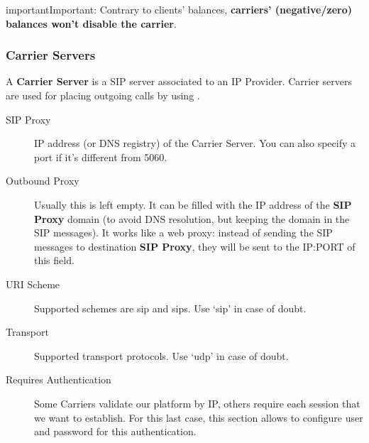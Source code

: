 \documentclass[letterpaper,10pt,english]{sphinxmanual}
\begin{document}
\begin{notice}{important}{Important:}
Contrary to clients' balances, \textbf{carriers' (negative/zero) balances won't disable the carrier}.
\end{notice}


\subsubsection{Carrier Servers}
\label{administration_portal/brand/providers/carriers:carrier-servers}
A \textbf{Carrier Server} is a SIP server associated to an IP Provider. Carrier servers
are used for placing outgoing calls by using {\hyperref[administration_portal/brand/routing/outgoing_routings:outgoing\string-routings]{}}.
\begin{description}
\item[{SIP Proxy}] \leavevmode{}\label{administration_portal/brand/providers/carriers:term-sip-proxy}
IP address (or DNS registry) of the Carrier Server. You can also specify
a port if it's different from 5060.

\item[{Outbound Proxy}] \leavevmode{}\label{administration_portal/brand/providers/carriers:term-outbound-proxy}
Usually this is left empty. It can be filled with the IP address of the
\textbf{SIP Proxy} domain (to avoid DNS resolution, but keeping the domain
in the SIP messages). It works like a web proxy: instead of sending the
SIP messages to destination \textbf{SIP Proxy}, they will be sent to the
IP:PORT of this field.

\item[{URI Scheme}] \leavevmode{}\label{administration_portal/brand/providers/carriers:term-uri-scheme}
Supported schemes are sip and sips. Use `sip' in case of doubt.

\item[{Transport}] \leavevmode{}\label{administration_portal/brand/providers/carriers:term-transport}
Supported transport protocols. Use `udp' in case of doubt.

\item[{Requires Authentication}] \leavevmode{}\label{administration_portal/brand/providers/carriers:term-requires-authentication}
Some Carriers validate our platform by IP, others require
each session that we want to establish. For this last case, this section
allows to configure user and password for this authentication.


\end{description}
\end{document}
